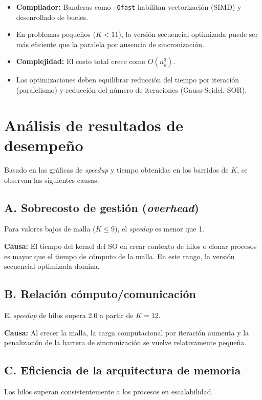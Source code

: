 \documentclass[11pt,a4paper]{article}
\begin{document}
\begin{itemize}[leftmargin=1.2cm]
    \item \textbf{Compilador:} Banderas como \texttt{-Ofast} habilitan vectorización (SIMD) y desenrollado de bucles.
    \item En problemas pequeños ($K<11$), la versión secuencial optimizada puede ser más eficiente que la paralela por ausencia de sincronización.
    \item \textbf{Complejidad:} El costo total crece como $O(n_k^3)$.
    \item Las optimizaciones deben equilibrar reducción del tiempo por iteración (paralelismo) y reducción del número de iteraciones (Gauss-Seidel, SOR).
\end{itemize}

\section{Análisis de resultados de desempeño}

Basado en las gráficas de \emph{speedup} y tiempo obtenidas en los barridos de $K$, se observan las siguientes causas:

\subsection*{A. Sobrecosto de gestión (\emph{overhead})}
Para valores bajos de malla ($K\leq 9$), el \emph{speedup} es menor que 1.

\textbf{Causa:} El tiempo del kernel del SO en crear contexto de hilos o clonar procesos es mayor que el tiempo de cómputo de la malla. En este rango, la versión secuencial optimizada domina.

\subsection*{B. Relación cómputo/comunicación}
El \emph{speedup} de hilos supera 2.0 a partir de $K=12$.

\textbf{Causa:} Al crecer la malla, la carga computacional por iteración aumenta y la penalización de la barrera de sincronización se vuelve relativamente pequeña.

\subsection*{C. Eficiencia de la arquitectura de memoria}
Los hilos superan consistentemente a los procesos en escalabilidad.
\end{document}
